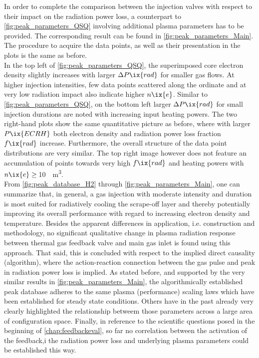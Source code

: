 %
            In order to complete the comparison between the injection valves with respect to their impact on the radiation power loss, a counterpart to \cref{fig:peak_parameters_QSQ} involving additional plasma parameters has to be provided. The corresponding result can be found in \cref{fig:peak_parameters_Main}. The procedure to acquire the data points, as well as their presentation in the plots is the same as before.\\%
            In the top left of \cref{fig:peak_parameters_QSQ}, the superimposed core electron density slightly increases with larger $\Delta P\ix{rad}$ for smaller gas flows. At higher injection intensities, few data points scattered along the ordinate and at very low radiation impact also indicate higher $n\ix{e}$. Similar to \cref{fig:peak_parameters_QSQ}, on the bottom left larger $\Delta P\ix{rad}$ for small injection durations are noted with increasing input heating powers. The two right-hand plots show the same quantitative picture as before, where with larger $P\ix{ECRH}$ both electron density and radiation power loss fraction $f\ix{rad}$ increase. Furthermore, the overall structure of the data point distributions are very similar. The top right image however does not feature an accumulation of points towards very high $f\ix{rad}$ and heating powers with $n\ix{e}\ge\,$\SI{10}{\per\cubic\meter}.\\%
            From \cref{fig:peak_database_H2} through \cref{fig:peak_parameters_Main}, one can summarize that, in general, a gas injection with moderate intensity and duration is most suited for radiatively cooling the scrape-off layer and thereby potentially improving its overall performance with regard to increasing electron density and temperature. Besides the apparent differences in application, i.e. construction and methodology, no significant qualitative change in plasma radiation response between thermal gas feedback valve and main gas inlet is found using this approach. That said, this is concluded with respect to the implied direct causality (algorithm), where the action-reaction connection between the gas pulse and peak in radiation power loss is implied. As stated before, and supported by the very similar results in \cref{fig:peak_parameters_Main}, the algorithmically established peak database adheres to the same plasma (performance) scaling laws which have been established for steady state conditions. Others have in the past already very clearly highlighted the relationship betweem those parameters across a large area of configuration space. Finally, in reference to the scientific questions posed in the beginning of \cref{chap:feedbackeval}, so far no correlation between the activation of the feedback,i the radiation power loss and underlying plasma parameters could be established this way.\\%
